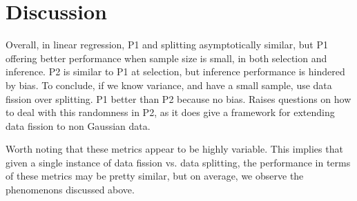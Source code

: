 \section{Discussion}
Overall, in linear regression, P1 and splitting asymptotically similar, but P1 offering better performance when sample size is small, in both selection and inference. P2 is similar to P1 at selection, but inference performance is hindered by bias. To conclude, if we know variance, and have a small sample, use data fission over splitting. P1 better than P2 because no bias. Raises questions on how to deal with this randomness in P2, as it does give a framework for extending data fission to non Gaussian data.

Worth noting that these metrics appear to be highly variable. This implies that given a single instance of data fission vs. data splitting, the performance in terms of these metrics may be pretty similar, but on average, we observe the phenomenons discussed above.